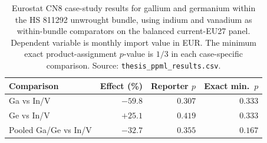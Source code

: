 \begin{table}[H]
\centering
\caption{Eurostat CN8 case-study results for gallium and germanium within the
HS 811292 unwrought bundle, using indium and vanadium as within-bundle
comparators on the balanced current-EU27 panel. Dependent variable is monthly
import value in EUR. The minimum exact product-assignment $p$-value is $1/3$ in
each case-specific comparison. Source: \texttt{thesis\_ppml\_results.csv}.}
\label{tab:eurostat}
\footnotesize
\begin{tabular}{lrrr}
\toprule
Comparison & Effect (\%) & Reporter $p$ & Exact min.\ $p$ \\
\midrule
Ga vs In/V            & $-59.8$ & $0.307$ & $0.333$ \\
Ge vs In/V            & $+25.1$ & $0.419$ & $0.333$ \\
Pooled Ga/Ge vs In/V  & $-32.7$ & $0.355$ & $0.167$ \\
\bottomrule
\end{tabular}
\end{table}
